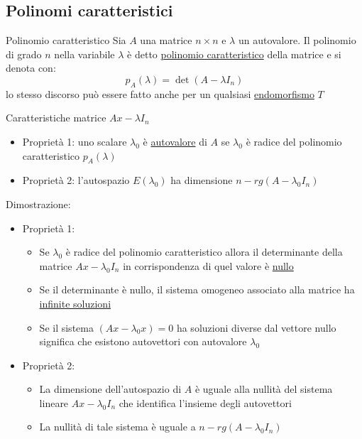 \subsection{Polinomi caratteristici}
\begin{definizione}{Polinomio caratteristico}
	Sia $ A $ una matrice $ n \times n $ e $ \lambda  $ un autovalore. Il polinomio di grado $ n $ nella variabile $ \lambda  $ è detto \underline{polinomio caratteristico} della matrice e si denota con:
	\[
		p_A\left( \lambda  \right) = \det \left( A- \lambda I_n \right)
	\]
	lo stesso discorso può essere fatto anche per un qualsiasi \underline{endomorfismo} $ T $
\end{definizione}
\begin{teorema}{Caratteristiche matrice $ Ax - \lambda  I_n $}
	\begin{itemize}
		\item Proprietà 1: uno scalare $ \lambda_0  $ è \underline{autovalore} di $ A $ se $ \lambda_0 $ è radice del polinomio caratteristico $ p_A \left( \lambda  \right)  $
		\item Proprietà 2: l'autospazio $ E\left( \lambda _0 \right)  $ ha dimensione $ n- rg \left( A- \lambda _0 I_n \right)  $
	\end{itemize}
\end{teorema}
Dimostrazione:
\begin{itemize}
	\item Proprietà 1:
	      \begin{itemize}
		      \item Se $ \lambda_0 $ è radice del polinomio caratteristico allora il determinante della matrice $ Ax - \lambda_0 I_n $ in corrispondenza di quel valore è \underline{nullo}
		      \item Se il determinante è nullo, il sistema omogeneo associato alla matrice ha \underline{infinite soluzioni}
		      \item Se il sistema $ \left( Ax - \lambda_0 x \right) = 0  $ ha soluzioni diverse dal vettore nullo significa che esistono autovettori con autovalore $ \lambda_0 $
	      \end{itemize}
	\item Proprietà 2:
	      \begin{itemize}
		      \item La dimensione dell'autospazio di $ A $ è uguale alla nullità del sistema lineare $ Ax - \lambda_0 I_n $ che identifica l'insieme degli autovettori
		      \item La nullità di tale sistema è uguale a $ n-rg\left( A- \lambda_0 I_n \right)  $
	      \end{itemize}
\end{itemize}

